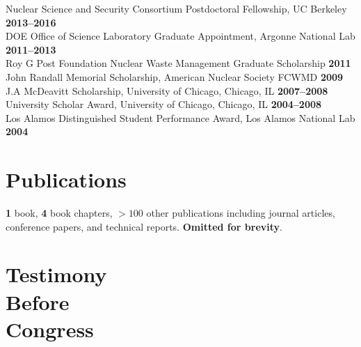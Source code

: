 \documentclass[margin,line]{resume}
\begin{document}
\begin{resume}
                Nuclear Science and Security Consortium Postdoctoral Fellowship, UC Berkeley  \hfill \textbf{2013--2016}\vspace{.5mm}\\%
                DOE Office of Science Laboratory Graduate Appointment, Argonne National Lab   \hfill \textbf{2011--2013}\vspace{.5mm}\\%
                Roy G  Post Foundation Nuclear Waste Management Graduate Scholarship                \hfill \textbf{2011}\vspace{.5mm}\\%
                John Randall Memorial Scholarship, American Nuclear Society FCWMD                   \hfill \textbf{2009}\vspace{.5mm}\\%
                J.A  McDeavitt Scholarship, University of Chicago, Chicago, IL                 \hfill\textbf{2007--2008}\vspace{.5mm}\\%
                University Scholar Award, University of Chicago, Chicago, IL                   \hfill\textbf{2004--2008}\vspace{.5mm}\\%
                Los Alamos Distinguished Student Performance Award, Los Alamos National Lab                         \hfill\textbf{2004}%
               \vspace{-2mm}
    \section{\mysidestyle Publications}
                \textbf{1} book, \textbf{4} book chapters, \textbf{$>100$} 
                other publications including journal articles, conference 
                papers, and technical reports. \textbf{Omitted for brevity}.
                \vspace{.5mm}\\%
    \section{\mysidestyle Testimony\\Before\\Congress}
    \begin{bibenum}
       \item {}
       \item {}
       \item {}
       \item {}
       \item {}
       \item {}
    \end{bibenum}


\end{resume}
\end{document}
